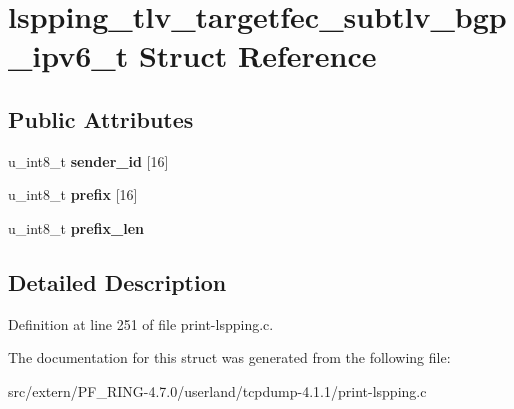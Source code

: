 \hypertarget{structlspping__tlv__targetfec__subtlv__bgp__ipv6__t}{
\section{lspping\_\-tlv\_\-targetfec\_\-subtlv\_\-bgp\_\-ipv6\_\-t Struct Reference}
\label{structlspping__tlv__targetfec__subtlv__bgp__ipv6__t}
}
\subsection*{Public Attributes}
\begin{DoxyCompactItemize}
\item 
\hypertarget{structlspping__tlv__targetfec__subtlv__bgp__ipv6__t_a80c896cbab22a51210b1a3519d2d058c}{
u\_\-int8\_\-t {\bfseries sender\_\-id} \mbox{[}16\mbox{]}}
\label{structlspping__tlv__targetfec__subtlv__bgp__ipv6__t_a80c896cbab22a51210b1a3519d2d058c}

\item 
\hypertarget{structlspping__tlv__targetfec__subtlv__bgp__ipv6__t_a672dcfd3d238703ab8507af9bd9237fd}{
u\_\-int8\_\-t {\bfseries prefix} \mbox{[}16\mbox{]}}
\label{structlspping__tlv__targetfec__subtlv__bgp__ipv6__t_a672dcfd3d238703ab8507af9bd9237fd}

\item 
\hypertarget{structlspping__tlv__targetfec__subtlv__bgp__ipv6__t_aaf4dd69cab45468565122c8f88849bee}{
u\_\-int8\_\-t {\bfseries prefix\_\-len}}
\label{structlspping__tlv__targetfec__subtlv__bgp__ipv6__t_aaf4dd69cab45468565122c8f88849bee}

\end{DoxyCompactItemize}


\subsection{Detailed Description}


Definition at line 251 of file print-\/lspping.c.



The documentation for this struct was generated from the following file:\begin{DoxyCompactItemize}
\item 
src/extern/PF\_\-RING-\/4.7.0/userland/tcpdump-\/4.1.1/print-\/lspping.c\end{DoxyCompactItemize}
